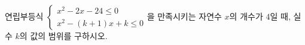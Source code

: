 \hspace*{2mm}\begin{minipage}[t]{\dimexpr\linewidth-2mm\relax}\vspace{0pt}
연립부등식 $\begin{cases} x^2-2x-24\le 0 \\ x^2-(k+1)x+k\le 0 \end{cases}$을 만족시키는 자연수 $x$의 개수가 $4$일 때, 실수 $k$의 값의 범위를 구하시오.\end{minipage}
